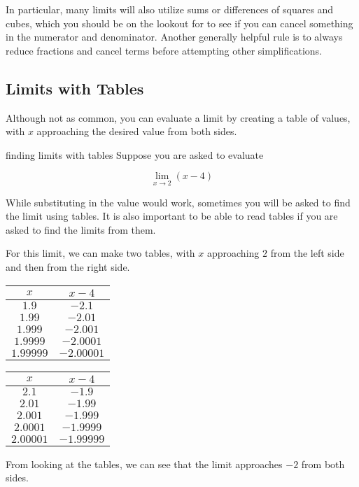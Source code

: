 In particular, many limits will also utilize sums or differences of squares and cubes, which you should be on the lookout for to see if you can cancel something in the numerator and denominator. Another generally helpful rule is to always reduce fractions and cancel terms before attempting other simplifications.

\subsection{Limits with Tables}

Although not as common, you can evaluate a limit by creating a table of values, with \( x \) approaching the desired value from both sides.

\begin{example}{finding limits with tables}
    Suppose you are asked to evaluate
    
    \[ \lim_{x \to 2} \left( x - 4 \right) \]
    
    While substituting in the value would work, sometimes you will be asked to find the limit using tables. It is also important to be able to read tables if you are asked to find the limits from them.
    
    For this limit, we can make two tables, with \( x \) approaching \( 2 \) from the left side and then from the right side.
    
    \begin{center}
    \begin{tabular}{c|c}
        \( x \) & \( x - 4 \) \\
        \hline
        \( 1.9 \)     & \( -2.1 \) \\
        \( 1.99 \)    & \( -2.01 \) \\
        \( 1.999 \)   & \( -2.001 \) \\
        \( 1.9999 \)  & \( -2.0001 \) \\
        \( 1.99999 \) & \( -2.00001 \) \\
    \end{tabular}
    \hspace{0.5cm}
    \begin{tabular}{c|c}
        \( x \) & \( x - 4 \) \\
        \hline
        \( 2.1 \)     & \( -1.9 \) \\
        \( 2.01 \)    & \( -1.99 \) \\
        \( 2.001 \)   & \( -1.999 \) \\
        \( 2.0001 \)  & \( -1.9999 \) \\
        \( 2.00001 \) & \( -1.99999 \) \\
    \end{tabular}
    \end{center}
    
    From looking at the tables, we can see that the limit approaches \( -2 \) from both sides.
\end{example}

